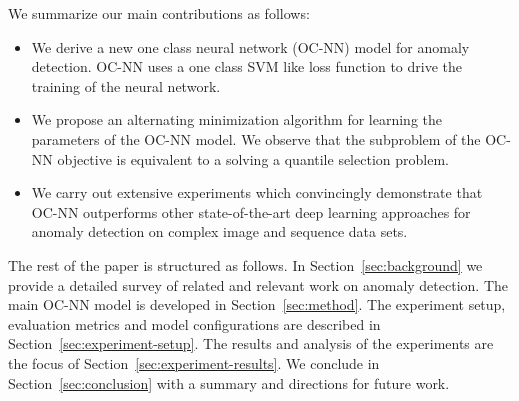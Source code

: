 We summarize our main contributions as follows:
\begin{itemize}
\item We derive a new one class neural network (OC-NN) model for anomaly detection. OC-NN uses a one class SVM like loss function to drive the training
of the neural network.
\item We propose an alternating minimization algorithm for learning the parameters of the OC-NN model. We observe that the subproblem of
the OC-NN objective is equivalent to a solving a quantile selection problem.
\item We carry out extensive experiments which convincingly demonstrate  that OC-NN  outperforms other state-of-the-art deep learning approaches
for anomaly detection on complex image and sequence data sets.
\end{itemize}

The rest of the paper is structured as follows. In Section~\ref{sec:background} we provide a detailed survey of related and relevant
work on anomaly detection. The main OC-NN model is developed in Section~\ref{sec:method}. The experiment setup, evaluation metrics and
model configurations are described in Section~\ref{sec:experiment-setup}. The results and analysis of the experiments are the focus of
Section~\ref{sec:experiment-results}. We conclude in Section~\ref{sec:conclusion} with a summary and directions for future work.

